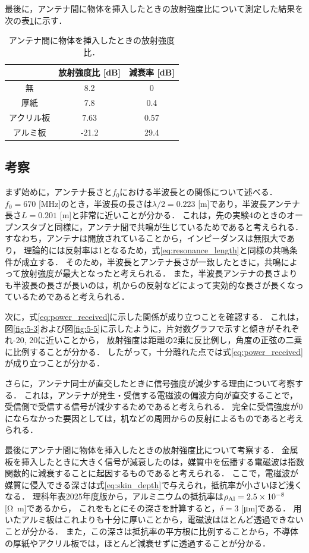 \documentclass[uplatex,dvipdfmx,a4j,12pt]{jsarticle}
\begin{document}
最後に，アンテナ間に物体を挿入したときの放射強度比について測定した結果を次の表\ref{table:5-2}に示す．

\begin{table}[H]
    \centering
    \caption{アンテナ間に物体を挿入したときの放射強度比．}
    \label{table:5-2}
    \begin{tabular}{ccc}
        \hline
        & 放射強度比 [dB] & 減衰率 [dB]\\
        \hline
        \hline
        無 & 8.2 & 0 \\
        厚紙 & 7.8 & 0.4\\
        アクリル板 & 7.63 & 0.57\\
        アルミ板 & -21.2 & 29.4\\
        \hline
    \end{tabular}
\end{table}


\subsection{考察}
まず始めに，アンテナ長さと$f_0$における半波長との関係について述べる．
$f_0 = 670$ [MHz]のとき，半波長の長さは$\lambda / 2 = 0.223$ [m]であり，半波長アンテナ長さ$L = 0.201$ [m]と非常に近いことが分かる．
これは，先の実験4のときのオープンスタブと同様に，アンテナ間で共鳴が生じているためであると考えられる．
すなわち，アンテナは開放されていることから，インピーダンスは無限大であり，
理論的には反射率は1となるため，式\eqref{eq:resonance_length}と同様の共鳴条件が成立する．
そのため，半波長とアンテナ長さが一致したときに，共鳴によって放射強度が最大となったと考えられる．
また，半波長アンテナの長さよりも半波長の長さが長いのは，机からの反射などによって実効的な長さが長くなっているためであると考えられる．

次に，式\eqref{eq:power_received}に示した関係が成り立つことを確認する．
これは，図\ref{fig:5-3}および図\ref{fig:5-5}に示したように，片対数グラフで示すと傾きがそれぞれ-20, 20に近いことから，
放射強度は距離の2乗に反比例し，角度の正弦の二乗に比例することが分かる．
したがって，十分離れた点では式\eqref{eq:power_received}が成り立つことが分かる．

さらに，アンテナ同士が直交したときに信号強度が減少する理由について考察する．
これは，アンテナが発生・受信する電磁波の偏波方向が直交することで，受信側で受信する信号が減少するためであると考えられる．
完全に受信強度が0にならなかった要因としては，机などの周囲からの反射によるものであると考えられる．

最後にアンテナ間に物体を挿入したときの放射強度比について考察する．
金属板を挿入したときに大きく信号が減衰したのは，媒質中を伝播する電磁波は指数関数的に減衰することに起因するものであると考えられる．
ここで，電磁波が媒質に侵入できる深さは式\eqref{eq:skin_depth}で与えられ，抵抗率が小さいほど浅くなる．
理科年表2025年度版から，アルミニウムの抵抗率は$\rho_{\ce{Al}} = 2.5 \times 10^{-8}$ [\si{\ohm \meter}]であるから，
これをもとにその深さを計算すると，$\delta = 3$ [\si{\micro \meter}]である．
用いたアルミ板はこれよりも十分に厚いことから，電磁波はほとんど透過できないことが分かる．
また，この深さは抵抗率の平方根に比例することから，不導体の厚紙やアクリル板では，ほとんど減衰せずに透過することが分かる．
\end{document}
